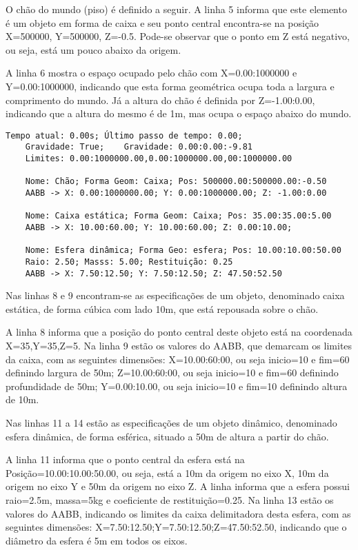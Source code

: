 \documentclass[12pt]{article}
\begin{document}
O chão do mundo (piso) é definido a seguir. A linha 5 informa que este elemento é um objeto em forma de caixa e seu ponto central encontra-se na posição X=500000, Y=500000, Z=-0.5. Pode-se observar que o ponto em Z está negativo, ou seja, está um pouco abaixo da origem. 

A linha 6 mostra o espaço ocupado pelo chão com X=0.00:1000000 e Y=0.00:1000000, indicando que esta forma geométrica ocupa toda a largura e comprimento do mundo. Já a altura do chão é  definida por Z=-1.00:0.00, indicando que a altura do mesmo é de 1m, mas ocupa o espaço abaixo do mundo.

\begin{lstlisting}[frame=single,caption=Registro Acessível: Inicialização do ambiente\label{lg:init_world}]
	Tempo atual: 0.00s; Último passo de tempo: 0.00; 
	Gravidade: True; 	Gravidade: 0.00:0.00:-9.81
	Limites: 0.00:1000000.00,0.00:1000000.00,00:1000000.00

	Nome: Chão; Forma Geom: Caixa; Pos: 500000.00:500000.00:-0.50
	AABB -> X: 0.00:1000000.00; Y: 0.00:1000000.00; Z: -1.00:0.00
		
	Nome: Caixa estática; Forma Geom: Caixa; Pos: 35.00:35.00:5.00
	AABB -> X: 10.00:60.00; Y: 10.00:60.00; Z: 0.00:10.00; 
	
	Nome: Esfera dinâmica; Forma Geo: esfera; Pos: 10.00:10.00:50.00
	Raio: 2.50; Masss: 5.00; Restituição: 0.25
	AABB -> X: 7.50:12.50; Y: 7.50:12.50; Z: 47.50:52.50
\end{lstlisting}

Nas linhas 8 e 9 encontram-se as especificações de um objeto, denominado caixa estática, de forma cúbica com lado 10m, que está repousada sobre o chão.

A linha 8 informa que a posição do ponto central deste objeto está na coordenada X=35,Y=35,Z=5. Na linha 9 estão os valores do AABB, que demarcam os limites da caixa, com as seguintes dimensões: X=10.00:60:00, ou seja inicio=10 e fim=60 definindo largura de 50m; Z=10.00:60:00, ou seja inicio=10 e fim=60 definindo profundidade de 50m; Y=0.00:10.00, ou seja inicio=10 e fim=10 definindo altura de 10m.

Nas linhas 11 a 14 estão as especificações de um objeto dinâmico, denominado esfera dinâmica, de forma esférica, situado a 50m de altura a partir do chão. 

A linha 11 informa que o ponto central da esfera está na Posição=10.00:10.00:50.00, ou seja, está a 10m da origem no eixo X, 10m da origem no eixo Y e 50m da origem no eixo Z. A linha informa que a esfera possui raio=2.5m, massa=5kg e coeficiente de restituição=0.25. Na linha 13 estão os valores do AABB, indicando os limites da caixa delimitadora desta esfera, com as seguintes dimensões: X=7.50:12.50;Y=7.50:12.50;Z=47.50:52.50, indicando que o diâmetro da esfera é 5m em todos os eixos.
\end{document}
